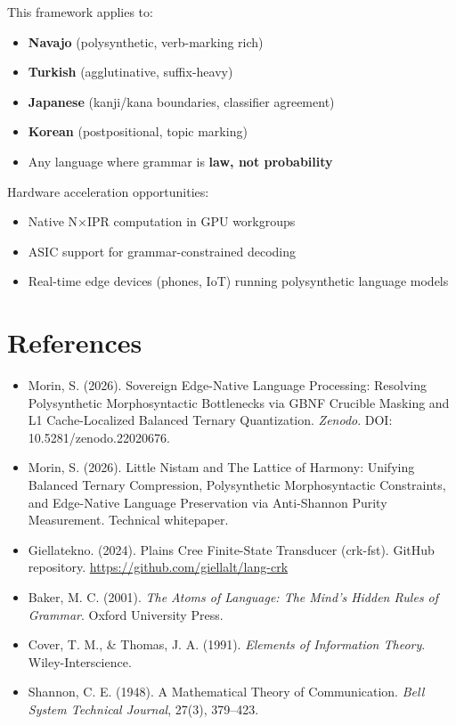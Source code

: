 \documentclass[11pt,oneside]{article}
\begin{document}
This framework applies to:
\begin{itemize}
  \item \textbf{Navajo} (polysynthetic, verb-marking rich)
  \item \textbf{Turkish} (agglutinative, suffix-heavy)
  \item \textbf{Japanese} (kanji/kana boundaries, classifier agreement)
  \item \textbf{Korean} (postpositional, topic marking)
  \item Any language where grammar is \textbf{law, not probability}
\end{itemize}

Hardware acceleration opportunities:
\begin{itemize}
  \item Native N×IPR computation in GPU workgroups
  \item ASIC support for grammar-constrained decoding
  \item Real-time edge devices (phones, IoT) running polysynthetic language models
\end{itemize}

\section*{References}

\begin{itemize}
  \item Morin, S. (2026). Sovereign Edge-Native Language Processing: Resolving Polysynthetic Morphosyntactic Bottlenecks via GBNF Crucible Masking and L1 Cache-Localized Balanced Ternary Quantization. \emph{Zenodo}. DOI: 10.5281/zenodo.22020676.
  \item Morin, S. (2026). Little Nistam and The Lattice of Harmony: Unifying Balanced Ternary Compression, Polysynthetic Morphosyntactic Constraints, and Edge-Native Language Preservation via Anti-Shannon Purity Measurement. Technical whitepaper.
  \item Giellatekno. (2024). Plains Cree Finite-State Transducer (crk-fst). GitHub repository. \url{https://github.com/giellalt/lang-crk}
  \item Baker, M. C. (2001). \emph{The Atoms of Language: The Mind's Hidden Rules of Grammar}. Oxford University Press.
  \item Cover, T. M., \& Thomas, J. A. (1991). \emph{Elements of Information Theory}. Wiley-Interscience.
  \item Shannon, C. E. (1948). A Mathematical Theory of Communication. \emph{Bell System Technical Journal}, 27(3), 379--423.
\end{itemize}
\end{document}
